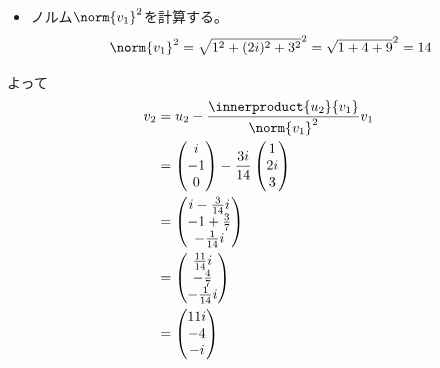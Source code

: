 \begin{souanswer}
\begin{enumerate}
\begin{itemize}
	\item ノルム$\norm{v_1}^2$を計算する。
\begin{equation*}
	\norm{v_1}^2= \sqrt{1^2+ (2i)^2+ 3^2}^2= \sqrt{1+ 4+ 9}^2= 14
\end{equation*}
\end{itemize}
	よって
\begin{align*}
	v_2
	&= u_2- \frac{\innerproduct{u_2}{v_1}}{\norm{v_1}^2}v_1\\
	&= \begin{pmatrix}i\\ -1\\ 0\end{pmatrix}- \frac{3i}{14}\begin{pmatrix}1\\ 2i\\ 3\end{pmatrix}\\
	&= \begin{pmatrix}i- \frac{3}{14}i\\ -1+ \frac{3}{7}\\ -\frac{1}{14}i\end{pmatrix}\\
	&= \begin{pmatrix}\frac{11}{14}i\\ -\frac{4}{7}\\ -\frac{1}{14}i\end{pmatrix}\\
	&= \begin{pmatrix}11i\\ -4\\ -i\end{pmatrix}
\end{align*}
\end{enumerate}
\end{souanswer}